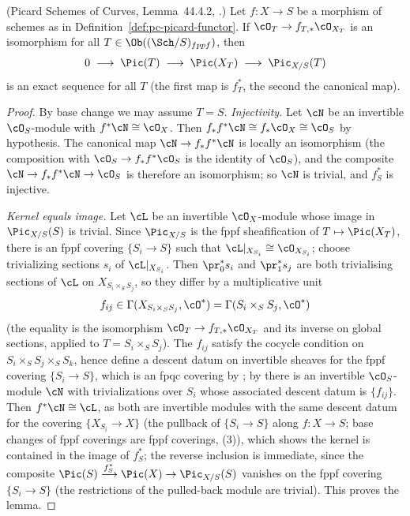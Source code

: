 \begin{lemma}
\label{lem:pc-pic-exact}
(Picard Schemes of Curves, Lemma~44.4.2,
.)
Let $f:X\to S$ be a morphism of schemes as in
Definition~\ref{def:pc-picard-functor}.
If $\cO_T\to f_{T,*}\cO_{X_T}$ is an isomorphism for all
$T\in\Ob((\Sch/S)_{fppf})$, then
\[
0\;\longrightarrow\;\Pic(T)\;\longrightarrow\;\Pic(X_T)\;
\longrightarrow\;\Pic_{X/S}(T)
\]
is an exact sequence for all $T$ (the first map is $f_T^*$, the second the
canonical map).
\end{lemma}
\begin{proof}
By base change we may assume $T=S$.  \emph{Injectivity.}  Let $\cN$ be an
invertible $\cO_S$-module with $f^*\cN\cong\cO_X$.  Then
$f_*f^*\cN\cong f_*\cO_X\cong\cO_S$ by hypothesis.  The canonical map
$\cN\to f_*f^*\cN$ is locally an isomorphism (the composition with
$\cO_S\to f_*f^*\cO_S$ is the identity of $\cO_S$), and the composite
$\cN\to f_*f^*\cN\to\cO_S$ is therefore an isomorphism; so $\cN$ is
trivial, and $f_S^*$ is injective.

\emph{Kernel equals image.}  Let $\cL$ be an invertible $\cO_X$-module
whose image in $\Pic_{X/S}(S)$ is trivial.  Since $\Pic_{X/S}$ is the
fppf sheafification of $T\mapsto\Pic(X_T)$, there is an fppf covering
$\{S_i\to S\}$ such that $\cL|_{X_{S_i}}\cong\cO_{X_{S_i}}$; choose
trivializing sections $s_i$ of $\cL|_{X_{S_i}}$.  Then $\pr_0^*s_i$ and
$\pr_1^*s_j$ are both trivialising sections of $\cL$ on
$X_{S_i\times_SS_j}$, so they differ by a multiplicative unit
\[
f_{ij}\in\Gamma(X_{S_i\times_SS_j},\cO^*)
=\Gamma(S_i\times_SS_j,\cO^*)
\]
(the equality is the isomorphism $\cO_T\to f_{T,*}\cO_{X_T}$ and its
inverse on global sections, applied to
$T=S_i\times_SS_j$).  The $f_{ij}$ satisfy the cocycle condition on
$S_i\times_SS_j\times_SS_k$, hence define a descent datum on invertible
sheaves for the fppf covering $\{S_i\to S\}$, which is an fpqc covering by
; by  there is an
invertible $\cO_S$-module $\cN$ with trivializations over $S_i$ whose
associated descent datum is $\{f_{ij}\}$.  Then $f^*\cN\cong\cL$, as both are
invertible modules with the same descent datum for the covering
$\{X_{S_i}\to X\}$ (the pullback of $\{S_i\to S\}$ along $f:X\to S$; base
changes of fppf coverings are fppf coverings,
(3)), which shows the kernel is contained in the
image of $f_S^*$; the reverse inclusion is immediate, since the composite
$\Pic(S)\xrightarrow{f_S^*}\Pic(X)\to\Pic_{X/S}(S)$ vanishes on the
fppf covering $\{S_i\to S\}$ (the restrictions of the pulled-back module
are trivial).  This proves the lemma.
\end{proof}

